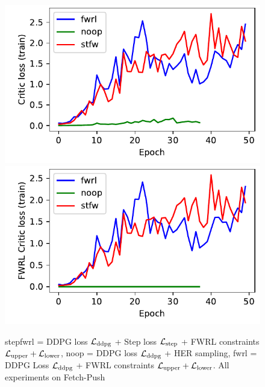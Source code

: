 \begin{figure}
  \includegraphics[width=\frac\columnwidth]{media/res/ea0e35b-FetchPush-v1-stfw-none/train/critic_loss.pdf}%
  \includegraphics[width=\frac\columnwidth]{media/res/ea0e35b-FetchPush-v1-stfw-none/train/critic_addnl_loss.pdf}%
  \caption{stepfwrl = DDPG loss $\mathcal{L}_{\text{ddpg}}$ + Step loss $\mathcal{L}_{\text{step}}$
    + FWRL constraints $\mathcal{L}_{\text{upper}} + \mathcal{L}_{\text{lower}}$, noop =
    DDPG loss $\mathcal{L}_{\text{ddpg}}$  + HER
    sampling, fwrl = DDPG Loss $\mathcal{L}_{\text{ddpg}}$ + FWRL constraints $\mathcal{L}_{\text{upper}} + \mathcal{L}_{\text{lower}}$.
    All experiments on Fetch-Push}
  \label{fig:loss-func-fetch-push}
\end{figure}
%